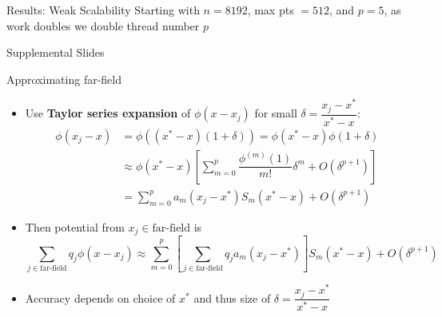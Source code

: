 \documentclass{beamer}
\newcommand{\pr}[1]{\left(#1\right)}
\newcommand{\br}[1]{\left[#1\right]}
\begin{document}
\begin{frame}{Results: Weak Scalability}
    \pause
    Starting with $n=8192$, max pts $=512$, and $p=5$, as work doubles we double thread number $p$ 
\end{frame}

\begin{frame}{Supplemental Slides}
\end{frame}

\begin{frame}{Approximating far-field}
  \begin{itemize}
  \item Use \textbf{Taylor series expansion} of $\phi(x-x_j)$ for small $\delta = \dfrac{x_j-x^*}{x^*-x}$:
  \begin{align*}
  \phi(x_j-x) & = \phi\pr{(x^*-x)\pr{1+\delta}}= \phi(x^*-x)\phi(1+\delta)\\
  & \approx \phi(x^*-x)\br{\sum_{m=0}^p \dfrac{\phi^{(m)}(1)}{m!}\delta^m + O(\delta^{p+1})}\\
  & = \sum_{m=0}^p a_m(x_j-x^*)S_m(x^*-x) + O(\delta^{p+1})
  \end{align*}
  \item Then potential from $x_j\in\text{far-field}$ is
  \[
  \sum_{j\in\text{far-field}} q_j\phi(x-x_j) \approx \sum_{m=0}^p \br{\sum_{j\in\text{far-field}} q_j a_m(x_j-x^*)} S_m(x^*-x)+ O(\delta^{p+1})
  \]
  \item Accuracy depends on choice of $x^*$ and thus size of  $\delta = \dfrac{x_j-x^*}{x^*-x}$
  \end{itemize}
\end{frame}
\end{document}
